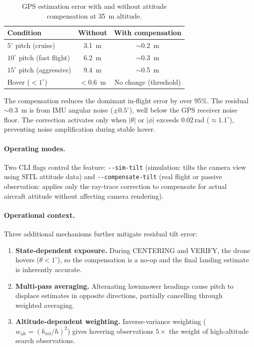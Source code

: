 \documentclass[10pt,a4paper]{article}
\begin{document}
\begin{table}[ht]
  \centering
  \caption{GPS estimation error with and without attitude compensation at \SI{35}{\metre} altitude.}\label{tab:cv-tilt-compensation}
  \begin{tabular}{lcc}
    \toprule
    \textbf{Condition} & \textbf{Without} & \textbf{With compensation} \\
    \midrule
    $5^{\circ}$ pitch (cruise)    & \SI{3.1}{\metre}  & $\sim$\SI{0.2}{\metre} \\
    $10^{\circ}$ pitch (fast flight) & \SI{6.2}{\metre}  & $\sim$\SI{0.3}{\metre} \\
    $15^{\circ}$ pitch (aggressive) & \SI{9.4}{\metre}  & $\sim$\SI{0.5}{\metre} \\
    Hover ($< 1^{\circ}$)          & $<$\SI{0.6}{\metre} & No change (threshold) \\
    \bottomrule
  \end{tabular}
\end{table}

\noindent The compensation reduces the dominant in-flight error by over 95\%.  The residual $\sim$\SI{0.3}{\metre} is from IMU angular noise ($\pm 0.5^{\circ}$), well below the GPS receiver noise floor.  The correction activates only when $|\theta|$ or $|\phi|$ exceeds $0.02$\,rad ($\approx 1.1^{\circ}$), preventing noise amplification during stable hover.

\paragraph{Operating modes.}
Two CLI flags control the feature: \texttt{-{}-sim-tilt} (simulation: tilts the camera view using SITL attitude data) and \texttt{-{}-compensate-tilt} (real flight or passive observation: applies only the ray-trace correction to compensate for actual aircraft attitude without affecting camera rendering).

\paragraph{Operational context.}
Three additional mechanisms further mitigate residual tilt error:

\begin{enumerate}
  \item \textbf{State-dependent exposure.}  During CENTERING and VERIFY, the drone hovers ($\theta < 1^{\circ}$), so the compensation is a no-op and the final landing estimate is inherently accurate.

  \item \textbf{Multi-pass averaging.}  Alternating lawnmower headings cause pitch to displace estimates in opposite directions, partially cancelling through weighted averaging.

  \item \textbf{Altitude-dependent weighting.}  Inverse-variance weighting ($w_\mathrm{alt} = (h_\mathrm{ref}/h)^2$) gives hovering observations $5\times$ the weight of high-altitude search observations.
\end{enumerate}
\end{document}
